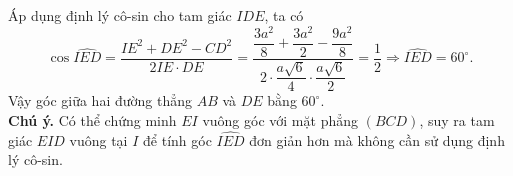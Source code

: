 \documentclass[12pt,a4paper,oneside]{book}
\begin{document}
\begin{ex}
{{
}
\noindent Áp dụng định lý cô-sin cho tam giác $ IDE $, ta có \[\cos\widehat{IED}=\dfrac{IE^2+DE^2-CD^2}{2IE\cdot DE}=\dfrac{\dfrac{3a^2}{8}+\dfrac{3a^2}{2}-\dfrac{9a^2}{8}}{2\cdot\dfrac{a\sqrt{6}}{4}\cdot \dfrac{a\sqrt{6}}{2}}=\dfrac{1}{2}\Rightarrow \widehat{IED}=60^\circ . \]
Vậy góc giữa hai đường thẳng $ AB $ và $ DE $ bằng $ 60^\circ .$\\ \textbf{Chú ý.} Có thể chứng minh $ EI $ vuông góc với mặt phẳng $ (BCD) $, suy ra tam giác $ EID $ vuông tại $ I $ để  tính góc $ \widehat{IED} $ đơn giản hơn mà không cần sử dụng định lý cô-sin.
}
\end{ex}
\end{document}
